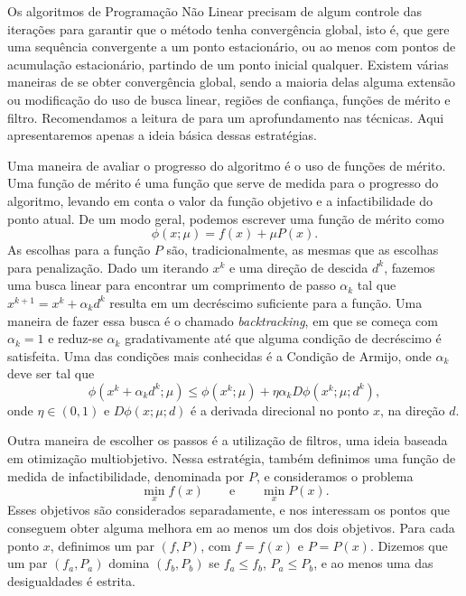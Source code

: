 Os algoritmos de Programação Não Linear precisam de algum controle das
iterações para garantir que o método tenha convergência global, isto é, que gere
uma sequência convergente a um ponto estacionário, ou ao menos com pontos de
acumulação estacionário, partindo de um ponto inicial qualquer.
Existem várias maneiras de se obter convergência global, sendo a maioria
delas alguma extensão ou modificação do uso de busca linear, regiões de
confiança, funções de mérito e filtro. Recomendamos a leitura de
\cite{bib:book-luenberger, bib:book-nocedal, bib:book-conn-trust} para um
aprofundamento nas técnicas. Aqui apresentaremos apenas a ideia básica dessas
estratégias.

Uma maneira de avaliar o progresso do algoritmo é o uso de funções de mérito.
Uma função de mérito é uma função que serve de medida para o progresso do
algoritmo, levando em conta o valor da função objetivo e a infactibilidade do
ponto atual. De um modo geral, podemos escrever uma função de mérito como
$$ \phi(x;\mu) = f(x) + \mu P(x). $$
As escolhas para a função $P$ são, tradicionalmente, as mesmas que as escolhas
para penalização.
Dado um iterando $x^k$ e uma direção de descida $d^k$, fazemos uma busca linear
para encontrar um comprimento de passo $\alpha_k$ tal que $x^{k+1} = x^k +
\alpha_k d^k$
resulta em um decréscimo suficiente para a função.
Uma maneira de fazer essa busca é o chamado \emph{backtracking}, em que se começa
com $\alpha_k = 1$ e reduz-se $\alpha_k$ gradativamente até que alguma
condição de decréscimo é satisfeita.
Uma das condições mais conhecidas é a Condição de Armijo, onde $\alpha_k$ deve
ser tal que
$$ \phi(x^k + \alpha_kd^k;\mu) \leq \phi(x^k;\mu) +
\eta\alpha_k D\phi(x^k;\mu;d^k), $$
onde $\eta\in(0,1)$ e $D\phi(x;\mu;d)$ é a derivada direcional no ponto $x$, na
direção $d$. 

Outra maneira de escolher os passos é a utilização de filtros, uma ideia baseada
em otimização multiobjetivo. Nessa estratégia, também definimos uma função de
medida de infactibilidade, denominada por $P$, e consideramos o problema
\begin{equation}
  \min_x f(x) \qquad \mbox{e} \qquad \min_x P(x). \nonumber
\end{equation}
Esses objetivos são considerados separadamente, e nos interessam os pontos que
conseguem obter alguma melhora em ao menos um dos dois objetivos.
Para cada ponto $x$, definimos um par $(f, P)$, com $f = f(x)$ e $P = P(x)$.
Dizemos que um par $(f_a,P_a)$ domina $(f_b,P_b)$ se $f_a \leq f_b$,
$P_a \leq P_b$, e ao menos uma das desigualdades é estrita.

